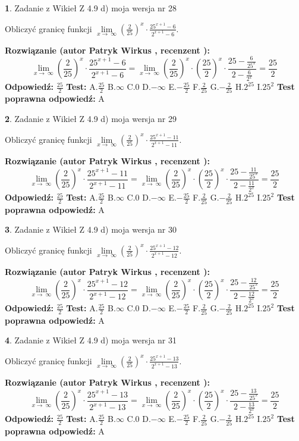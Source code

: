 \documentclass[12pt, a4paper]{article}
\theoremstyle{definition} %
\newtheorem{zad}{}
\newcommand{\zadStart}[1]{\begin{zad}#1\newline}
\newcommand{\zadStop}{\end{zad}}
\newcommand{\rozwStart}[2]{\noindent \textbf{Rozwiązanie (autor #1 , recenzent #2): }\newline}
\newcommand{\rozwStop}{\newline}
\newcommand{\odpStart}{\noindent \textbf{Odpowiedź:}\newline}
\newcommand{\odpStop}{\newline}
\newcommand{\testStart}{\noindent \textbf{Test:}\newline}
\newcommand{\testStop}{\newline}
\newcommand{\kluczStart}{\noindent \textbf{Test poprawna odpowiedź:}\newline}
\newcommand{\kluczStop}{\newline}
\begin{document}
\zadStart{Zadanie z Wikieł Z 4.9 d) moja wersja nr 28}


Obliczyć granicę funkcji  $\lim\limits_{x\to\ \infty}(\frac{2}{25})^{x}\cdot\frac{25^{x+1}-6}{2^{x+1}-6}$.
\zadStop
\rozwStart{Patryk Wirkus}{}
$$\lim\limits_{x\to\ \infty}(\frac{2}{25})^{x}\cdot\frac{25^{x+1}-6}{2^{x+1}-6}=\lim\limits_{x\to\ \infty}(\frac{2}{25})^{x}\cdot(\frac{25}{2})^{x} \cdot \frac{25-\frac{6}{25^{x}}}{2-\frac{6}{2^{x}}} = \frac{25}{2}$$
\rozwStop
\odpStart
$\frac{25}{2}$
\odpStop
\testStart
A.$\frac{25}{2}$ B.$\infty$ C.$0$ D.$-\infty$ E.$-\frac{25}{2}$
F.$\frac{2}{25}$ G.$-\frac{2}{25}$
H.$2^{25}$
I.$25^{2}$
\testStop
\kluczStart
A
\kluczStop



\zadStart{Zadanie z Wikieł Z 4.9 d) moja wersja nr 29}


Obliczyć granicę funkcji  $\lim\limits_{x\to\ \infty}(\frac{2}{25})^{x}\cdot\frac{25^{x+1}-11}{2^{x+1}-11}$.
\zadStop
\rozwStart{Patryk Wirkus}{}
$$\lim\limits_{x\to\ \infty}(\frac{2}{25})^{x}\cdot\frac{25^{x+1}-11}{2^{x+1}-11}=\lim\limits_{x\to\ \infty}(\frac{2}{25})^{x}\cdot(\frac{25}{2})^{x} \cdot \frac{25-\frac{11}{25^{x}}}{2-\frac{11}{2^{x}}} = \frac{25}{2}$$
\rozwStop
\odpStart
$\frac{25}{2}$
\odpStop
\testStart
A.$\frac{25}{2}$ B.$\infty$ C.$0$ D.$-\infty$ E.$-\frac{25}{2}$
F.$\frac{2}{25}$ G.$-\frac{2}{25}$
H.$2^{25}$
I.$25^{2}$
\testStop
\kluczStart
A
\kluczStop



\zadStart{Zadanie z Wikieł Z 4.9 d) moja wersja nr 30}


Obliczyć granicę funkcji  $\lim\limits_{x\to\ \infty}(\frac{2}{25})^{x}\cdot\frac{25^{x+1}-12}{2^{x+1}-12}$.
\zadStop
\rozwStart{Patryk Wirkus}{}
$$\lim\limits_{x\to\ \infty}(\frac{2}{25})^{x}\cdot\frac{25^{x+1}-12}{2^{x+1}-12}=\lim\limits_{x\to\ \infty}(\frac{2}{25})^{x}\cdot(\frac{25}{2})^{x} \cdot \frac{25-\frac{12}{25^{x}}}{2-\frac{12}{2^{x}}} = \frac{25}{2}$$
\rozwStop
\odpStart
$\frac{25}{2}$
\odpStop
\testStart
A.$\frac{25}{2}$ B.$\infty$ C.$0$ D.$-\infty$ E.$-\frac{25}{2}$
F.$\frac{2}{25}$ G.$-\frac{2}{25}$
H.$2^{25}$
I.$25^{2}$
\testStop
\kluczStart
A
\kluczStop



\zadStart{Zadanie z Wikieł Z 4.9 d) moja wersja nr 31}


Obliczyć granicę funkcji  $\lim\limits_{x\to\ \infty}(\frac{2}{25})^{x}\cdot\frac{25^{x+1}-13}{2^{x+1}-13}$.
\zadStop
\rozwStart{Patryk Wirkus}{}
$$\lim\limits_{x\to\ \infty}(\frac{2}{25})^{x}\cdot\frac{25^{x+1}-13}{2^{x+1}-13}=\lim\limits_{x\to\ \infty}(\frac{2}{25})^{x}\cdot(\frac{25}{2})^{x} \cdot \frac{25-\frac{13}{25^{x}}}{2-\frac{13}{2^{x}}} = \frac{25}{2}$$
\rozwStop
\odpStart
$\frac{25}{2}$
\odpStop
\testStart
A.$\frac{25}{2}$ B.$\infty$ C.$0$ D.$-\infty$ E.$-\frac{25}{2}$
F.$\frac{2}{25}$ G.$-\frac{2}{25}$
H.$2^{25}$
I.$25^{2}$
\testStop
\kluczStart
A
\kluczStop
\end{document}
